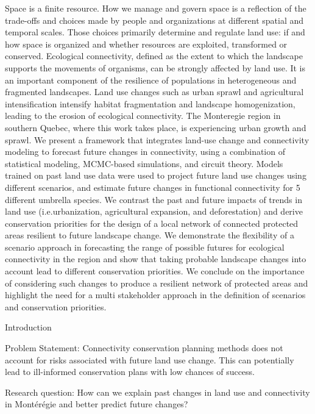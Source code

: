 \documentclass[]{article}
\begin{document}
Space is a finite resource. How we manage and govern space is a
reflection of the trade-offs and choices made by people and
organizations at different spatial and temporal scales. Those choices
primarily determine and regulate land use: if and how space is organized
and whether resources are exploited, transformed or conserved.
Ecological connectivity, defined as the extent to which the landscape
supports the movements of organisms, can be strongly affected by land
use. It is an important component of the resilience of populations in
heterogeneous and fragmented landscapes. Land use changes such as urban
sprawl and agricultural intensification intensify habitat fragmentation
and landscape homogenization, leading to the erosion of ecological
connectivity. The Monteregie region in southern Quebec, where this work
takes place, is experiencing urban growth and sprawl. We present a
framework that integrates land-use change and connectivity modeling to
forecast future changes in connectivity, using a combination of
statistical modeling, MCMC-based simulations, and circuit theory. Models
trained on past land use data were used to project future land use
changes using different scenarios, and estimate future changes in
functional connectivity for 5 different umbrella species. We contrast
the past and future impacts of trends in land use (i.e.urbanization,
agricultural expansion, and deforestation) and derive conservation
priorities for the design of a local network of connected protected
areas resilient to future landscape change. We demonstrate the
flexibility of a scenario approach in forecasting the range of possible
futures for ecological connectivity in the region and show that taking
probable landscape changes into account lead to different conservation
priorities. We conclude on the importance of considering such changes to
produce a resilient network of protected areas and highlight the need
for a multi stakeholder approach in the definition of scenarios and
conservation priorities.

Introduction

Problem Statement: Connectivity conservation planning methods does not
account for risks associated with future land use change. This can
potentially lead to ill-informed conservation plans with low chances of
success.

Research question: How can we explain past changes in land use and
connectivity in Montérégie and better predict future changes?
\end{document}
